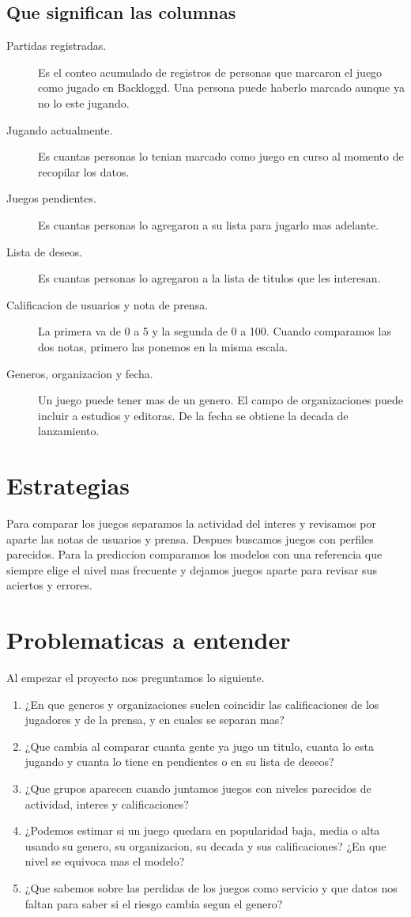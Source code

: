 \subsection{Que significan las columnas}
\begin{description}
\item[Partidas registradas.] Es el conteo acumulado de registros de personas que marcaron el juego como jugado en Backloggd. Una persona puede haberlo marcado aunque ya no lo este jugando.
\item[Jugando actualmente.] Es cuantas personas lo tenian marcado como juego en curso al momento de recopilar los datos.
\item[Juegos pendientes.] Es cuantas personas lo agregaron a su lista para jugarlo mas adelante.
\item[Lista de deseos.] Es cuantas personas lo agregaron a la lista de titulos que les interesan.
\item[Calificacion de usuarios y nota de prensa.] La primera va de 0 a 5 y la segunda de 0 a 100. Cuando comparamos las dos notas, primero las ponemos en la misma escala.
\item[Generos, organizacion y fecha.] Un juego puede tener mas de un genero. El campo de organizaciones puede incluir a estudios y editoras. De la fecha se obtiene la decada de lanzamiento.
\end{description}

\section{Estrategias}
Para comparar los juegos separamos la actividad del interes y revisamos por aparte las notas de usuarios y prensa. Despues buscamos juegos con perfiles parecidos. Para la prediccion comparamos los modelos con una referencia que siempre elige el nivel mas frecuente y dejamos juegos aparte para revisar sus aciertos y errores.

\section{Problematicas a entender}
Al empezar el proyecto nos preguntamos lo siguiente.

\begin{enumerate}
\item ¿En que generos y organizaciones suelen coincidir las calificaciones de los jugadores y de la prensa, y en cuales se separan mas?
\item ¿Que cambia al comparar cuanta gente ya jugo un titulo, cuanta lo esta jugando y cuanta lo tiene en pendientes o en su lista de deseos?
\item ¿Que grupos aparecen cuando juntamos juegos con niveles parecidos de actividad, interes y calificaciones?
\item ¿Podemos estimar si un juego quedara en popularidad baja, media o alta usando su genero, su organizacion, su decada y sus calificaciones? ¿En que nivel se equivoca mas el modelo?
\item ¿Que sabemos sobre las perdidas de los juegos como servicio y que datos nos faltan para saber si el riesgo cambia segun el genero?
\end{enumerate}


